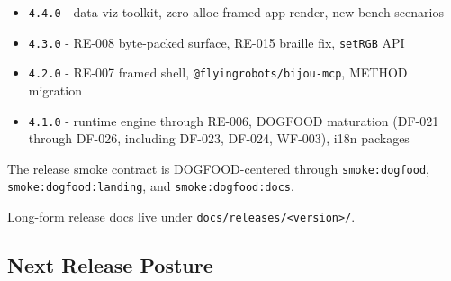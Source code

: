 \begin{itemize}
\item
  \texttt{4\allowbreak{}.\allowbreak{}4\allowbreak{}.\allowbreak{}0} - data-viz toolkit, zero-alloc framed app render, new bench scenarios
\item
  \texttt{4\allowbreak{}.\allowbreak{}3\allowbreak{}.\allowbreak{}0} - RE-008 byte-packed surface, RE-015 braille fix, \texttt{s\allowbreak{}e\allowbreak{}t\allowbreak{}R\allowbreak{}G\allowbreak{}B} API
\item
  \texttt{4\allowbreak{}.\allowbreak{}2\allowbreak{}.\allowbreak{}0} - RE-007 framed shell, \texttt{@\allowbreak{}f\allowbreak{}l\allowbreak{}y\allowbreak{}i\allowbreak{}n\allowbreak{}g\allowbreak{}r\allowbreak{}o\allowbreak{}b\allowbreak{}o\allowbreak{}t\allowbreak{}s\allowbreak{}/\allowbreak{}b\allowbreak{}i\allowbreak{}j\allowbreak{}o\allowbreak{}u\allowbreak{}-\allowbreak{}m\allowbreak{}c\allowbreak{}p}, METHOD migration
\item
  \texttt{4\allowbreak{}.\allowbreak{}1\allowbreak{}.\allowbreak{}0} - runtime engine through RE-006, DOGFOOD maturation (DF-021 through DF-026, including DF-023, DF-024, WF-003), i18n packages
\end{itemize}

The release smoke contract is DOGFOOD-centered through \texttt{s\allowbreak{}m\allowbreak{}o\allowbreak{}k\allowbreak{}e\allowbreak{}:\allowbreak{}d\allowbreak{}o\allowbreak{}g\allowbreak{}f\allowbreak{}o\allowbreak{}o\allowbreak{}d}, \texttt{s\allowbreak{}m\allowbreak{}o\allowbreak{}k\allowbreak{}e\allowbreak{}:\allowbreak{}d\allowbreak{}o\allowbreak{}g\allowbreak{}f\allowbreak{}o\allowbreak{}o\allowbreak{}d\allowbreak{}:\allowbreak{}l\allowbreak{}a\allowbreak{}n\allowbreak{}d\allowbreak{}i\allowbreak{}n\allowbreak{}g}, and \texttt{s\allowbreak{}m\allowbreak{}o\allowbreak{}k\allowbreak{}e\allowbreak{}:\allowbreak{}d\allowbreak{}o\allowbreak{}g\allowbreak{}f\allowbreak{}o\allowbreak{}o\allowbreak{}d\allowbreak{}:\allowbreak{}d\allowbreak{}o\allowbreak{}c\allowbreak{}s}.

Long-form release docs live under \texttt{d\allowbreak{}o\allowbreak{}c\allowbreak{}s\allowbreak{}/\allowbreak{}r\allowbreak{}e\allowbreak{}l\allowbreak{}e\allowbreak{}a\allowbreak{}s\allowbreak{}e\allowbreak{}s\allowbreak{}/\allowbreak{}<\allowbreak{}v\allowbreak{}e\allowbreak{}r\allowbreak{}s\allowbreak{}i\allowbreak{}o\allowbreak{}n\allowbreak{}>\allowbreak{}/}.

\subsection{Next Release Posture}\label{record-274-next-release-posture}


